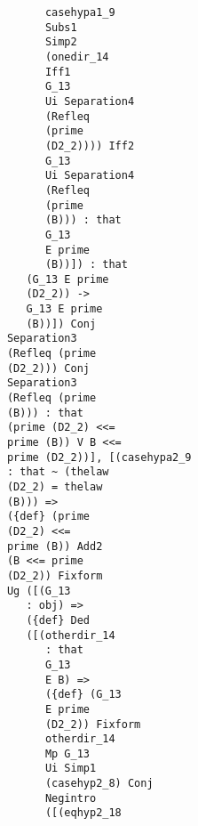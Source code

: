 \documentclass[12pt]{article}
\begin{document}
\begin{verbatim}
                                     casehypa1_9 
                                     Subs1 
                                     Simp2 
                                     (onedir_14 
                                     Iff1 
                                     G_13 
                                     Ui Separation4 
                                     (Refleq 
                                     (prime 
                                     (D2_2)))) Iff2 
                                     G_13 
                                     Ui Separation4 
                                     (Refleq 
                                     (prime 
                                     (B))) : that 
                                     G_13 
                                     E prime 
                                     (B))]) : that 
                                  (G_13 E prime 
                                  (D2_2)) -> 
                                  G_13 E prime 
                                  (B))]) Conj 
                               Separation3 
                               (Refleq (prime 
                               (D2_2))) Conj 
                               Separation3 
                               (Refleq (prime 
                               (B))) : that 
                               (prime (D2_2) <<= 
                               prime (B)) V B <<= 
                               prime (D2_2))], [(casehypa2_9 
                               : that ~ (thelaw 
                               (D2_2) = thelaw 
                               (B))) => 
                               ({def} (prime 
                               (D2_2) <<= 
                               prime (B)) Add2 
                               (B <<= prime 
                               (D2_2)) Fixform 
                               Ug ([(G_13 
                                  : obj) => 
                                  ({def} Ded 
                                  ([(otherdir_14 
                                     : that 
                                     G_13 
                                     E B) => 
                                     ({def} (G_13 
                                     E prime 
                                     (D2_2)) Fixform 
                                     otherdir_14 
                                     Mp G_13 
                                     Ui Simp1 
                                     (casehyp2_8) Conj 
                                     Negintro 
                                     ([(eqhyp2_18 

\end{verbatim}
\end{document}
